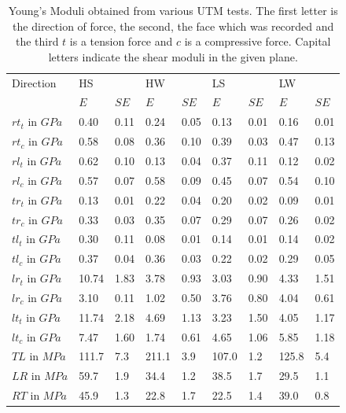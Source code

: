 \documentclass[10pt]{article}
\begin{document}
\begin{table}
\caption[Experimental Youngs Moduli]{Young's Moduli obtained from various UTM tests. The first letter is the direction of force, the second, the face which was recorded and the third \(t\) is a tension force and \(c\) is a compressive force. Capital letters indicate the shear moduli in the given plane. }
\label{table:youngs moduli}
\begin{tabular}{lllllllll}
\hline
Direction& HS && HW && LS && LW &\\
 & \(E\)&\(SE\)& \(E\)&\(SE\)& \(E\)&\(SE\)& \(E\)&\(SE\)\\
\hline
\(rt_t\) in \(GPa\) & 0.40 & 0.11 & 0.24 & 0.05 & 0.13 & 0.01 & 0.16 & 0.01 \\
\(rt_c\) in \(GPa\) & 0.58 & 0.08 & 0.36 & 0.10 & 0.39 & 0.03 & 0.47 & 0.13 \\
\(rl_t\) in \(GPa\) & 0.62 & 0.10 & 0.13 & 0.04 & 0.37 & 0.11 & 0.12 & 0.02 \\
\(rl_c\) in \(GPa\) & 0.57 & 0.07 & 0.58 & 0.09 & 0.45 & 0.07 & 0.54 & 0.10 \\
\(tr_t\) in \(GPa\) & 0.13 & 0.01 & 0.22 & 0.04 & 0.20 & 0.02 & 0.09 & 0.01 \\
\(tr_c\) in \(GPa\) & 0.33 & 0.03 & 0.35 & 0.07 & 0.29 & 0.07 & 0.26 & 0.02 \\
\(tl_t\) in \(GPa\) & 0.30 & 0.11 & 0.08 & 0.01 & 0.14 & 0.01 & 0.14 & 0.02 \\
\(tl_c\) in \(GPa\) & 0.37 & 0.04 & 0.36 & 0.03 & 0.22 & 0.02 & 0.29 & 0.05 \\
\(lr_t\) in \(GPa\) & 10.74 & 1.83 & 3.78 & 0.93 & 3.03 & 0.90 & 4.33 & 1.51 \\
\(lr_c\) in \(GPa\) & 3.10 & 0.11 & 1.02 & 0.50 & 3.76 & 0.80 & 4.04 & 0.61 \\
\(lt_t\) in \(GPa\) & 11.74 & 2.18 & 4.69 & 1.13 & 3.23& 1.50 & 4.05 & 1.17 \\
\(lt_c\) in \(GPa\) & 7.47 & 1.60 & 1.74 & 0.61 & 4.65 & 1.06 & 5.85 & 1.18 \\
\(TL\) in \(MPa\)   & 111.7 & 7.3 & 211.1& 3.9  & 107.0& 1.2  & 125.8& 5.4 \\
\(LR\) in \(MPa\)   & 59.7 & 1.9  & 34.4 & 1.2  & 38.5 & 1.7  & 29.5 & 1.1 \\
\(RT\) in \(MPa\)   & 45.9 & 1.3  & 22.8 & 1.7  & 22.5 & 1.4  & 39.0 & 0.8 \\
\hline
\end{tabular}
\end{table}
\end{document}
